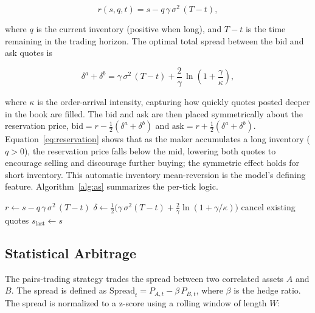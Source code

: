 \documentclass[12pt,oneside,a4paper]{report}
\begin{document}
\begin{equation}
r(s, q, t) = s - q\,\gamma\,\sigma^{2}\,(T - t),
\label{eq:reservation}
\end{equation}

where $q$ is the current inventory (positive when long), and $T - t$ is the time remaining in the trading horizon. The optimal total spread between the bid and ask quotes is

\begin{equation}
\delta^{a} + \delta^{b} = \gamma\,\sigma^{2}\,(T - t) + \frac{2}{\gamma}\,\ln\!\left(1 + \frac{\gamma}{\kappa}\right),
\label{eq:spread}
\end{equation}

where $\kappa$ is the order-arrival intensity, capturing how quickly quotes posted deeper in the book are filled. The bid and ask are then placed symmetrically about the reservation price, $\text{bid} = r - \tfrac{1}{2}(\delta^a + \delta^b)$ and $\text{ask} = r + \tfrac{1}{2}(\delta^a + \delta^b)$. Equation~\ref{eq:reservation} shows that as the maker accumulates a long inventory ($q > 0$), the reservation price falls below the mid, lowering both quotes to encourage selling and discourage further buying; the symmetric effect holds for short inventory. This automatic inventory mean-reversion is the model's defining feature. Algorithm~\ref{alg:as} summarizes the per-tick logic.

\begin{algorithm}[H]
\caption{Avellaneda-Stoikov quoting (per tick)}
\label{alg:as}
\SetAlgoLined
{}
$r \leftarrow s - q\,\gamma\,\sigma^{2}\,(T{-}t)$\;
$\delta \leftarrow \tfrac{1}{2}\big(\gamma\,\sigma^{2}(T{-}t) + \tfrac{2}{\gamma}\ln(1 + \gamma/\kappa)\big)$\;
cancel existing quotes\;
$s_{\text{last}} \leftarrow s$\;
\end{algorithm}

\subsection{Statistical Arbitrage}

The pairs-trading strategy trades the spread between two correlated assets $A$ and $B$. The spread is defined as $\text{Spread}_t = P_{A,t} - \beta\,P_{B,t}$, where $\beta$ is the hedge ratio. The spread is normalized to a z-score using a rolling window of length $W$:
\end{document}
